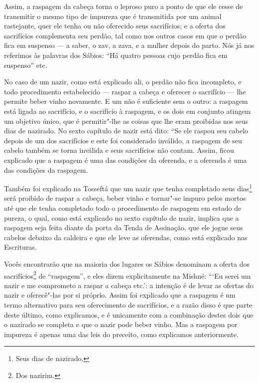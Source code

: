 \begin{multicols}{2}
Assim, a raspagem da cabeça torna o leproso puro a ponto de que ele
cesse de transmitir o mesmo tipo de impureza que é transmitida por um
animal rastejante, quer ele tenha ou não oferecido seus sacrifícios; e a
oferta dos sacrifícios complementa seu perdão, tal como nos outros casos
em que o perdão fica em suspenso --- a saber, o zav\starr, a zava\starr, e a
mulher depois do parto. Nós já nos referimos às palavras dos Sábios:
``Há quatro pessoas cujo perdão fica em suspenso'' etc.

No caso de um nazir\starr, como está explicado ali, o perdão não fica
incompleto, e todo procedimento estabelecido --- raspar a cabeça e
oferecer o sacrifício --- lhe permite beber vinho novamente. E um não é
suficiente sem o outro: a raspagem está ligada ao sacrifício, e o
sacrifício à raspagem, e os dois em conjunto atingem um objetivo único,
que é permitir"-lhe as coisas que lhe eram proibidas nos seus dias de
nazirado\starr. No sexto capítulo de nazir\starr{} está dito: ``Se ele raspou seu
cabelo depois de um dos sacrifícios e este foi considerado inválido, a
raspagem de seu cabelo também se torna inválida e seus sacrifícios não
contam. Assim, ficou explicado que a raspagem é uma das condições da
oferenda, e a oferenda é uma das condições da raspagem.

Também foi explicado na Tosseftá\starr{} que um nazir\starr{} que tenha completado seus dias\footnote{Seus dias de nazirado\starr.} será proibido de raspar a cabeça,
beber vinho e tornar"-se impuro pelos mortos até que ele tenha completado todo o procedimento de raspagem em estado de pureza, o qual, como está explicado no sexto capítulo de nazir\starr, implica que a raspagem seja feita diante da porta da Tenda de
Assinação, que ele jogue seus cabelos debaixo da caldeira e que ele
leve as oferendas, como está explicado nas Escrituras.

Vocês encontrarão que na maioria dos lugares os Sábios denominam
a oferta dos sacrifícios\footnote{Dos nazirim\starr.} de ``raspagem'', e eles
dizem explicitamente na Mishné: ```Eu serei um nazir\starr{} e me comprometo a
raspar a cabeça etc.': a intenção é de levar as ofertas do nazir\starr{} e
oferecê"-las por si próprio. Assim foi explicado que a raspagem é um
termo alternativo para seu oferecimento de sacrifícios, e a razão disso
é que parte deste último, como explicamos, e é unicamente com a
combinação destes dois que o nazirado\starr{} se completa e que o nazir\starr{} pode
beber vinho. Mas a raspagem por impureza é apenas uma das leis do
preceito, como explicamos anteriormente.


\end{multicols}
